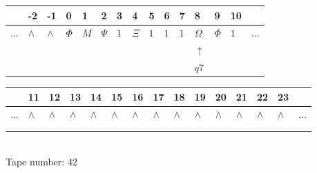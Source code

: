 \documentclass[11pt]{article}
\begin{document}
\begin{table}[H]
\centering
\begin{tabular}{lllllllllllllll}
 & -2 & -1 & 0 & 1 & 2 & 3 & 4 & 5 & 6 & 7 & 8 & 9 & 10 & \\
\hline
$...$ & \multicolumn{1}{|l|}{$\wedge$} & \multicolumn{1}{|l|}{$\wedge$} & \multicolumn{1}{|l|}{$\Phi$} & \multicolumn{1}{|l|}{$M$} & \multicolumn{1}{|l|}{$\Psi$} & \multicolumn{1}{|l|}{$1$} & \multicolumn{1}{|l|}{$\Xi$} & \multicolumn{1}{|l|}{$1$} & \multicolumn{1}{|l|}{$1$} & \multicolumn{1}{|l|}{$1$} & \multicolumn{1}{|l|}{$\Omega$} & \multicolumn{1}{|l|}{$\Phi$} & \multicolumn{1}{|l|}{$1$} & $...$\\
\hline
&  &  &  &  &  &  &  &  &  &  & $\uparrow$ &  &  &  \\
&  &  &  &  &  &  &  &  &  &  & $ q7 $ &  &  &  \\
\end{tabular}
\begin{tabular}{lllllllllllllll}
 & 11 & 12 & 13 & 14 & 15 & 16 & 17 & 18 & 19 & 20 & 21 & 22 & 23 & \\
\hline
$...$ & \multicolumn{1}{|l|}{$\wedge$} & \multicolumn{1}{|l|}{$\wedge$} & \multicolumn{1}{|l|}{$\wedge$} & \multicolumn{1}{|l|}{$\wedge$} & \multicolumn{1}{|l|}{$\wedge$} & \multicolumn{1}{|l|}{$\wedge$} & \multicolumn{1}{|l|}{$\wedge$} & \multicolumn{1}{|l|}{$\wedge$} & \multicolumn{1}{|l|}{$\wedge$} & \multicolumn{1}{|l|}{$\wedge$} & \multicolumn{1}{|l|}{$\wedge$} & \multicolumn{1}{|l|}{$\wedge$} & \multicolumn{1}{|l|}{$\wedge$} & $...$\\
\hline
&  &  &  &  &  &  &  &  &  &  &  &  &  &  \\
&  &  &  &  &  &  &  &  &  &  &  &  &  &  \\
\end{tabular}
\\
Tape number: 42
\noindent\makebox[\linewidth]{\hdashrule{\textwidth}{1pt}{1pt}}\end{table}
\end{document}
